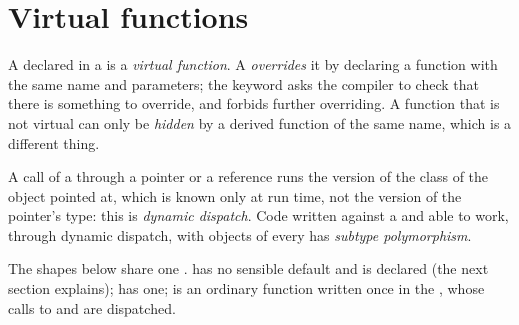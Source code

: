 \section{Virtual functions}\label{sec:b2:cpp-polymorphism:virtual}

\begin{definition}\label{def:b2:cpp-polymorphism:virtual}
A  declared  in a  is a \emph{virtual function}. A
 \emph{overrides} it by declaring a function with the same name and parameters; the
keyword  asks the compiler to check that there is something to override, and  forbids
further overriding. A function that is not virtual can only be \emph{hidden} by a derived function of the same name,
which is a different thing.
\end{definition}

\begin{definition}\label{def:b2:cpp-polymorphism:dispatch}
A call of a  through a pointer or a reference runs the version of the class of the object pointed
at, which is known only at run time, not the version of the pointer's type: this is \emph{dynamic
dispatch}. Code written against a  and able to work, through dynamic dispatch, with
objects of every  has \emph{subtype polymorphism}.
\end{definition}

The shapes below share one .  has no sensible default and is declared  (the next
section explains);  has one;  is an ordinary function written once in the ,
whose calls to  and  are dispatched.

\label{lst:b2:cpp-polymorphism:shapes}

\label{lst:b2:cpp-polymorphism:shapes-main}

